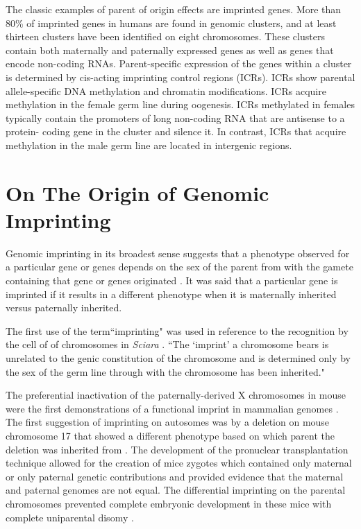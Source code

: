 The classic examples of parent of origin effects are imprinted genes. More than 80\% of imprinted genes in humans are found in genomic clusters, and at least thirteen clusters have been identified on eight chromosomes\cite{Lawson2013,Peters2014,Pires2014,Abramowitz2012}. These clusters contain both maternally and paternally expressed genes as well as genes that encode non-coding RNAs\cite{Peters2014,Abramowitz2012}. Parent-specific expression of the genes within a cluster is determined by cis-acting imprinting control regions (ICRs). ICRs show parental allele-specific DNA methylation and chromatin modifications. ICRs acquire methylation in the female germ line during oogenesis. ICRs methylated in females typically contain the promoters of long non-coding RNA that are antisense to a protein- coding gene in the cluster and silence it. In contrast, ICRs that acquire methylation in the male germ line are located in intergenic regions.

\section{On The Origin of Genomic Imprinting }

Genomic imprinting in its broadest sense suggests that a phenotype observed for a particular gene or genes depends on the sex of the parent from with the gamete containing that gene or genes originated \cite{Sapienza:1989vm}. It was said that a particular gene is imprinted if it results in a different phenotype when it is maternally inherited versus paternally inherited.

The first use of the term``imprinting" was used in reference to the recognition by the cell of of chromosomes in \textit{Sciara} \cite{Crouse:1960vc,Sapienza:1989vm}. ``The `imprint' a chromosome bears is unrelated to the genic constitution of the chromosome and is determined only by the sex of the germ line through with the chromosome has been inherited." \cite{Crouse:1960vc} 

The preferential inactivation of the paternally-derived X chromosomes in mouse were the first demonstrations of a functional imprint in mammalian genomes \cite{Takagi:1975ua,Lyon:1984gh,Chandra:1975tb}. The first suggestion of imprinting on autosomes was by a deletion on mouse chromosome 17 that showed a different phenotype based on which parent the deletion was inherited from \cite{Johnson:1974uf,Johnson:1974kc}. The development of the pronuclear transplantation technique allowed for the creation of mice zygotes which contained only maternal or only paternal genetic contributions and provided evidence that the maternal and paternal genomes are not equal. The differential imprinting on the parental chromosomes prevented complete embryonic development in these mice with complete uniparental disomy \cite{Sapienza:1989vm,McGrath:1984ky}. 

